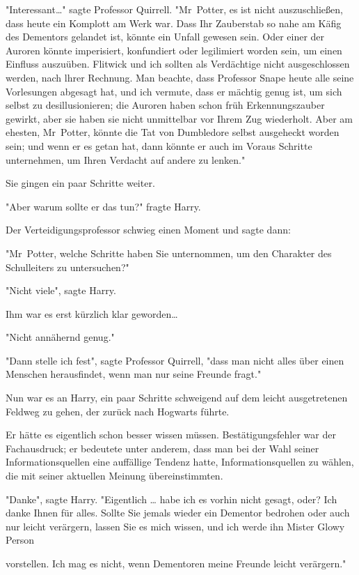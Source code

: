 {"Interessant…" sagte Professor Quirrell. "Mr~Potter, es ist nicht auszuschließen, dass heute ein Komplott am Werk war. Dass Ihr Zauberstab so nahe am Käfig des Dementors gelandet ist, könnte ein Unfall gewesen sein. Oder einer der Auroren könnte imperisiert, konfundiert oder legilimiert worden sein, um einen Einfluss auszuüben. Flitwick und ich sollten als Verdächtige nicht ausgeschlossen werden, nach lhrer Rechnung. Man beachte, dass Professor Snape heute alle seine Vorlesungen abgesagt hat, und ich vermute, dass er mächtig genug ist, um sich selbst zu desillusionieren; die Auroren haben schon früh Erkennungszauber gewirkt, aber sie haben sie nicht unmittelbar vor Ihrem Zug wiederholt. Aber am ehesten, Mr~Potter, könnte die Tat von Dumbledore selbst ausgeheckt worden sein; und wenn er es getan hat, dann könnte er auch im Voraus Schritte unternehmen, um Ihren Verdacht auf andere zu lenken."

Sie gingen ein paar Schritte weiter.

"Aber warum sollte er das tun?" fragte Harry.

Der Verteidigungsprofessor schwieg einen Moment und sagte dann:

"Mr~Potter, welche Schritte haben Sie unternommen, um den Charakter des Schulleiters zu untersuchen?"

"Nicht viele", sagte Harry.

Ihm war es erst kürzlich klar geworden…

"Nicht annähernd genug."

"Dann stelle ich fest", sagte Professor Quirrell, "dass man nicht alles über einen Menschen herausfindet, wenn man nur seine Freunde fragt."

Nun war es an Harry, ein paar Schritte schweigend auf dem leicht ausgetretenen Feldweg zu gehen, der zurück nach Hogwarts führte.

Er hätte es eigentlich schon besser wissen müssen. Bestätigungsfehler war der Fachausdruck; er bedeutete unter anderem, dass man bei der Wahl seiner Informationsquellen eine auffällige Tendenz hatte, Informationsquellen zu wählen, die mit seiner aktuellen Meinung übereinstimmten.

"Danke", sagte Harry. "Eigentlich … habe ich es vorhin nicht gesagt, oder? Ich danke Ihnen für alles. Sollte Sie jemals wieder ein Dementor bedrohen oder auch nur leicht verärgern, lassen Sie es mich wissen, und ich werde ihn Mister Glowy Person

vorstellen. Ich mag es nicht, wenn Dementoren meine Freunde leicht verärgern."

}
